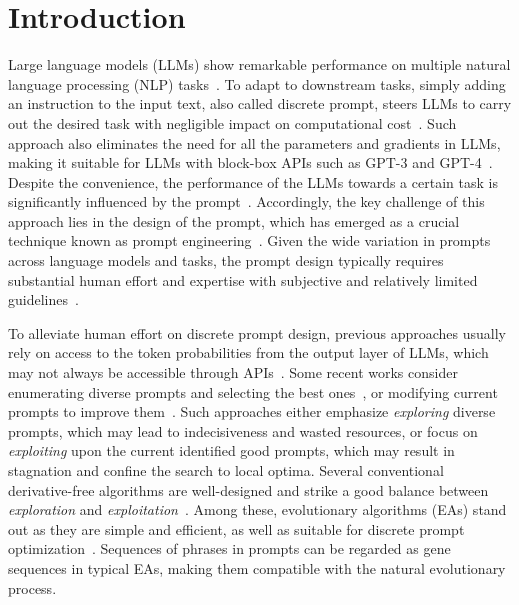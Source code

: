 \section{Introduction}
Large language models (LLMs) show remarkable performance on multiple natural language processing (NLP) tasks~\citep{touvron2023llama,ouyang2022training}.
To adapt to downstream tasks, simply adding an instruction to the input text, also called discrete prompt, steers LLMs to carry out the desired task with negligible impact on computational cost~\citep{liu2023pre}. Such approach also eliminates the need for all the parameters and gradients in LLMs, making it suitable for LLMs with block-box APIs such as GPT-3 and GPT-4~\citep{brown2020language,nori2023capabilities}. 
Despite the convenience, the performance of the LLMs towards a certain task is significantly influenced by the prompt~\citep{liu2023pre,zhu2023promptbench}. Accordingly, the key challenge of this approach lies in the design of the prompt, which has emerged as a crucial technique known as prompt engineering~\citep{zhou2022large}. Given the wide variation in prompts across language models and tasks, the prompt design typically requires substantial human effort and expertise with subjective and relatively limited guidelines~\citep{mishra2022reframing,mishra2022cross,liu2023pre,zamfirescu2023johnny,wang2023hint}. 

To alleviate human effort on discrete prompt design, previous approaches usually rely on access to the token probabilities from the output layer of LLMs, which may not always be accessible through APIs~\citep{deng2022rlprompt,zhang2023tempera}. Some recent works consider enumerating diverse prompts and selecting the best ones~\citep{zhou2022large,jiang2020can}, or modifying current prompts to improve them~\citep{guo2023learning,prasad2022grips,pryzant2023automatic}. Such approaches either emphasize \emph{exploring} diverse prompts, which may lead to indecisiveness and wasted resources, or focus on \emph{exploiting} upon the current identified good prompts, which may result in stagnation and confine the search to local optima. Several conventional derivative-free algorithms are well-designed and strike a good balance between \emph{exploration} and \emph{exploitation}~\citep{conn2009introduction, rios2013derivative}. Among these, evolutionary algorithms (EAs) stand out as they are simple and efficient, as well as suitable for discrete prompt optimization~\citep{storn1997differential,brest2006self,5208221,vesterstrom2004comparative}. Sequences of phrases in prompts can be regarded as gene sequences in typical EAs, making them compatible with the natural evolutionary process.







